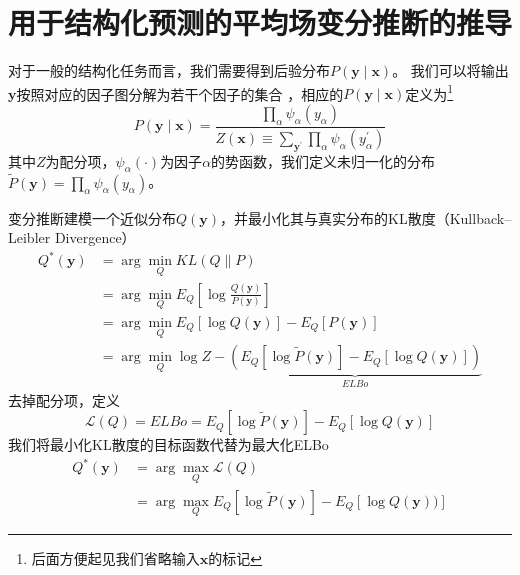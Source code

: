 \chapter{用于结构化预测的平均场变分推断的推导}
\label{appendix:mfvi-derivation}
对于一般的结构化任务而言，我们需要得到后验分布$P(\boldsymbol{y}\mid\boldsymbol{x})$。
我们可以将输出$\boldsymbol{y}$按照对应的因子图分解为若干个因子的集合 \citep{sutton-etal-2012-crf}，相应的$P(\boldsymbol{y}\mid\boldsymbol{x})$定义为\footnote{后面方便起见我们省略输入$\boldsymbol{x}$的标记}
\begin{equation}\label{eq:posterior}
	P(\boldsymbol{y}\mid\boldsymbol{x}) =\frac{\prod_{\alpha} \psi_{\alpha}(y_{\alpha})}{Z(\boldsymbol{x})\equiv\sum_{\boldsymbol{y}^{\prime}}\prod_{\alpha} \psi_{\alpha}(y^{\prime}_{\alpha})}
\end{equation}
其中$Z$为配分项，$\psi_{\alpha}(\cdot)$为因子$\alpha$的势函数，我们定义未归一化的分布$\tilde{P}(\boldsymbol{y})=\prod_{\alpha} \psi_{\alpha}(y_{\alpha})$。

变分推断建模一个近似分布$Q(\boldsymbol{y})$，并最小化其与真实分布的KL散度（Kullback–Leibler Divergence）
\begin{equation}
	\begin{split}
		Q^{\ast}(\boldsymbol{y})
		&=\arg\min_{Q} KL(Q\|P)\\
		&=\arg\min_{Q} E_{Q}\left[\log\frac{Q(\boldsymbol{y})}{P(\boldsymbol{y})}\right]\\
		&=\arg\min_{Q} E_{Q}\left[\log Q(\boldsymbol{y})\right] - E_{Q}\left[P(\boldsymbol{y})\right]\\
		&=\arg\min_{Q} \log Z-\underbrace{\left(E_{Q}\left[\log \tilde{P}(\boldsymbol{y})\right]-E_{Q}\left[\log Q(\boldsymbol{y})\right]\right)}_{ELBo}
	\end{split}
\end{equation}
去掉配分项，定义
\begin{equation}
	\mathcal{L}(Q)=ELBo=E_{Q}\left[\log \tilde{P}(\boldsymbol{y})\right]-E_{Q}\left[\log Q(\boldsymbol{y})\right]
\end{equation}
我们将最小化KL散度的目标函数代替为最大化ELBo
\begin{equation}
	\begin{split}
		Q^{\ast}(\boldsymbol{y}) &= \arg\max_{Q}\mathcal{L}(Q)\\
		&= \arg\max_{Q}E_{Q}\left[\log \tilde{P}(\boldsymbol{y})\right]-E_{Q}\left[\log Q(\boldsymbol{y}))\right]
	\end{split}
\end{equation}


